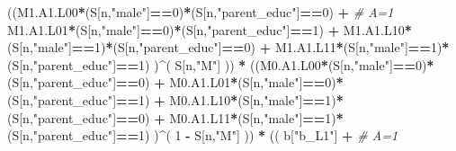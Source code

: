 \documentclass[
]{book}
\newenvironment{Shaded}{\begin{snugshade}}{\end{snugshade}}
\newcommand{\CommentTok}[1]{\textcolor[rgb]{0.56,0.35,0.01}{\textit{#1}}}
\newcommand{\DecValTok}[1]{\textcolor[rgb]{0.00,0.00,0.81}{#1}}
\newcommand{\NormalTok}[1]{#1}
\newcommand{\SpecialCharTok}[1]{\textcolor[rgb]{0.81,0.36,0.00}{\textbf{#1}}}
\newcommand{\StringTok}[1]{\textcolor[rgb]{0.31,0.60,0.02}{#1}}
\begin{document}
\begin{Shaded}
\begin{Highlighting}[]
\NormalTok{          ((M1.A1.L00}\SpecialCharTok{*}\NormalTok{(S[n,}\StringTok{"male"}\NormalTok{]}\SpecialCharTok{==}\DecValTok{0}\NormalTok{)}\SpecialCharTok{*}\NormalTok{(S[n,}\StringTok{"parent\_educ"}\NormalTok{]}\SpecialCharTok{==}\DecValTok{0}\NormalTok{) }\SpecialCharTok{+}                \CommentTok{\# A\textquotesingle{}=1}
\NormalTok{              M1.A1.L01}\SpecialCharTok{*}\NormalTok{(S[n,}\StringTok{"male"}\NormalTok{]}\SpecialCharTok{==}\DecValTok{0}\NormalTok{)}\SpecialCharTok{*}\NormalTok{(S[n,}\StringTok{"parent\_educ"}\NormalTok{]}\SpecialCharTok{==}\DecValTok{1}\NormalTok{) }\SpecialCharTok{+}
\NormalTok{              M1.A1.L10}\SpecialCharTok{*}\NormalTok{(S[n,}\StringTok{"male"}\NormalTok{]}\SpecialCharTok{==}\DecValTok{1}\NormalTok{)}\SpecialCharTok{*}\NormalTok{(S[n,}\StringTok{"parent\_educ"}\NormalTok{]}\SpecialCharTok{==}\DecValTok{0}\NormalTok{) }\SpecialCharTok{+} 
\NormalTok{              M1.A1.L11}\SpecialCharTok{*}\NormalTok{(S[n,}\StringTok{"male"}\NormalTok{]}\SpecialCharTok{==}\DecValTok{1}\NormalTok{)}\SpecialCharTok{*}\NormalTok{(S[n,}\StringTok{"parent\_educ"}\NormalTok{]}\SpecialCharTok{==}\DecValTok{1}\NormalTok{) )}\SpecialCharTok{\^{}}\NormalTok{( S[n,}\StringTok{"M"}\NormalTok{] )) }\SpecialCharTok{*}
\NormalTok{      ((M0.A1.L00}\SpecialCharTok{*}\NormalTok{(S[n,}\StringTok{"male"}\NormalTok{]}\SpecialCharTok{==}\DecValTok{0}\NormalTok{)}\SpecialCharTok{*}\NormalTok{(S[n,}\StringTok{"parent\_educ"}\NormalTok{]}\SpecialCharTok{==}\DecValTok{0}\NormalTok{) }\SpecialCharTok{+}                
\NormalTok{          M0.A1.L01}\SpecialCharTok{*}\NormalTok{(S[n,}\StringTok{"male"}\NormalTok{]}\SpecialCharTok{==}\DecValTok{0}\NormalTok{)}\SpecialCharTok{*}\NormalTok{(S[n,}\StringTok{"parent\_educ"}\NormalTok{]}\SpecialCharTok{==}\DecValTok{1}\NormalTok{) }\SpecialCharTok{+}
\NormalTok{          M0.A1.L10}\SpecialCharTok{*}\NormalTok{(S[n,}\StringTok{"male"}\NormalTok{]}\SpecialCharTok{==}\DecValTok{1}\NormalTok{)}\SpecialCharTok{*}\NormalTok{(S[n,}\StringTok{"parent\_educ"}\NormalTok{]}\SpecialCharTok{==}\DecValTok{0}\NormalTok{) }\SpecialCharTok{+} 
\NormalTok{          M0.A1.L11}\SpecialCharTok{*}\NormalTok{(S[n,}\StringTok{"male"}\NormalTok{]}\SpecialCharTok{==}\DecValTok{1}\NormalTok{)}\SpecialCharTok{*}\NormalTok{(S[n,}\StringTok{"parent\_educ"}\NormalTok{]}\SpecialCharTok{==}\DecValTok{1}\NormalTok{) )}\SpecialCharTok{\^{}}\NormalTok{( }\DecValTok{1} \SpecialCharTok{{-}}\NormalTok{ S[n,}\StringTok{"M"}\NormalTok{] )) }\SpecialCharTok{*}
\NormalTok{      (( b[}\StringTok{"b\_L1"}\NormalTok{] }\SpecialCharTok{+}                                                            \CommentTok{\# A=1}

\end{Highlighting}
\end{Shaded}
\end{document}
